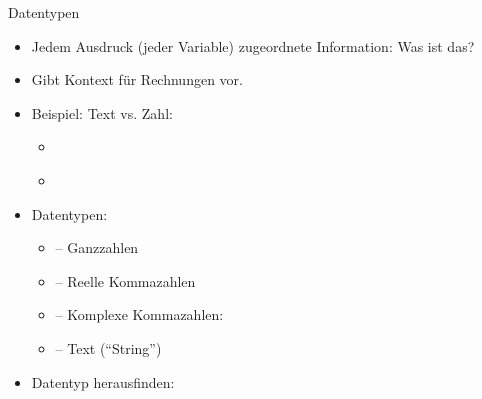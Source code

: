 \begin{frame}{Datentypen}
%
\begin{itemize}
\item Jedem Ausdruck (\zB jeder Variable) zugeordnete Information: Was ist das?
\item Gibt Kontext für Rechnungen vor.
\item Beispiel: Text vs. Zahl:
	\begin{itemize}
	\item {} \thus~ 
	\item {} \thus~ 
	\end{itemize}
\item Datentypen:
	\begin{itemize}
	\item {} -- Ganzzahlen
	\item {} -- Reelle Kommazahlen
	\item {} -- Komplexe Kommazahlen: 
	\item {} -- Text (\enquote{String})
	\end{itemize}
\item Datentyp herausfinden: 
\end{itemize}
%
\end{frame}